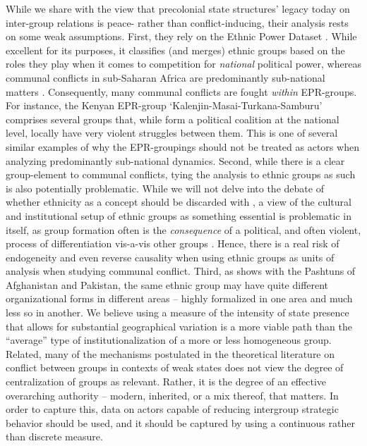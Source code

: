 While we share with \citet{Wig2018} the view that precolonial state structures'
legacy today on inter-group relations is peace- rather than conflict-inducing,
their analysis rests on some weak assumptions. First, they rely on the Ethnic
Power Dataset \citep{Cederman2010}. While excellent for its purposes, it
classifies (and merges) ethnic groups based on the roles they play when it comes
to competition for \textit{national} political power, whereas communal conflicts
in sub-Saharan Africa are predominantly sub-national matters
\citep{Hillesund_2017}. Consequently, many communal conflicts are fought
\textit{within} EPR-groups. For instance, the Kenyan EPR-group
`Kalenjin-Masai-Turkana-Samburu' comprises several groups that, while form a
political coalition at the national level, locally have very violent struggles
between them. This is one of several similar examples of why the EPR-groupings
should not be treated as actors when analyzing predominantly sub-national
dynamics. Second, while there is a clear group-element to communal conflicts,
tying the analysis to ethnic groups as such is also potentially problematic.
While we will not delve into the debate of whether ethnicity as a concept should
be discarded with \citep{Chandra2006}, a view of the cultural and institutional
setup of ethnic groups as something essential is problematic in itself, as group
formation often is the \textit{consequence} of a political, and often violent,
process of differentiation vis-a-vis other groups \citep[15]{barth1969,
GraeberDavid2021TDoE}.  Hence, there is a real risk of endogeneity and even
reverse causality when using ethnic groups as units of analysis when studying
communal conflict. Third, as \citet[12f]{barth1969} shows with the Pashtuns of
Afghanistan and Pakistan, the same ethnic group may have quite different
organizational forms in different areas -- highly formalized in one area and
much less so in another. We believe using a measure of the intensity of state
presence that allows for substantial geographical variation is a more viable
path than the ``average'' type of institutionalization of a more or less
homogeneous group. Related, many of the mechanisms postulated in the theoretical
literature on conflict between groups in contexts of weak states does not view
the degree of centralization of groups as relevant. Rather, it is the degree of
an effective overarching authority -- modern, inherited, or a mix thereof, that
matters.  In order to capture this, data on actors capable of reducing
intergroup strategic behavior should be used, and it should be captured by using
a continuous rather than discrete measure.

